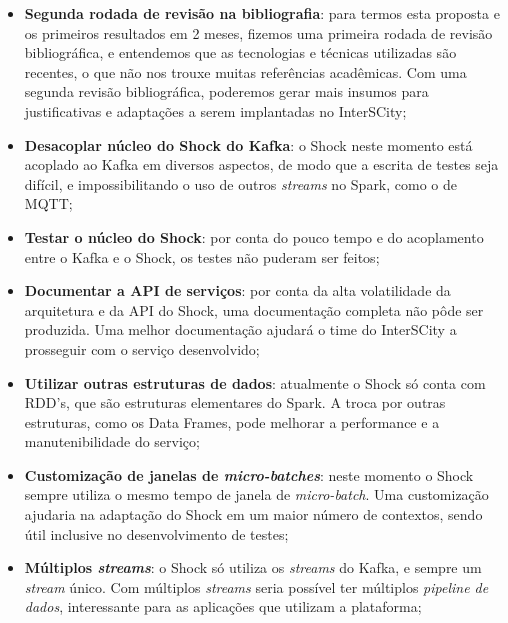 \begin{itemize}
    \item \textbf{Segunda rodada de revisão na bibliografia}: para termos esta
        proposta e os primeiros resultados em 2 meses, fizemos uma primeira
        rodada de revisão bibliográfica, e entendemos que as tecnologias e
        técnicas utilizadas são recentes, o que não nos trouxe muitas
        referências acadêmicas. Com uma segunda revisão bibliográfica,
        poderemos gerar mais insumos para justificativas e adaptações
        a serem implantadas no InterSCity;

    \item \textbf{Desacoplar núcleo do Shock do Kafka}: o Shock neste
        momento está acoplado ao Kafka em diversos aspectos, de modo que a
        escrita de testes seja difícil, e impossibilitando o uso de outros
        \textit{streams} no Spark, como o de MQTT;

    \item \textbf{Testar o núcleo do Shock}: por conta do pouco tempo e do
        acoplamento entre o Kafka e o Shock, os testes não puderam ser feitos;

    \item \textbf{Documentar a API de serviços}: por conta da alta volatilidade
        da arquitetura e da API do Shock, uma documentação completa não pôde ser
        produzida. Uma melhor documentação ajudará o time do InterSCity a
        prosseguir com o serviço desenvolvido;

    \item \textbf{Utilizar outras estruturas de dados}: atualmente o Shock só
        conta com RDD's, que são estruturas elementares do Spark. A troca por
        outras estruturas, como os Data Frames, pode melhorar a performance e a
        manutenibilidade do serviço;

    \item \textbf{Customização de janelas de \textit{micro-batches}}: neste
        momento o Shock sempre utiliza o mesmo tempo de janela de
        \textit{micro-batch}. Uma customização ajudaria na adaptação do Shock
        em um maior número de contextos, sendo útil inclusive no
        desenvolvimento de testes;

    \item \textbf{Múltiplos \textit{streams}}: o Shock só utiliza os
        \textit{streams} do Kafka, e sempre um \textit{stream} único. Com
        múltiplos \textit{streams} seria possível ter múltiplos \textit{
        pipeline de dados}, interessante para as aplicações que utilizam
        a plataforma;


\end{itemize}

